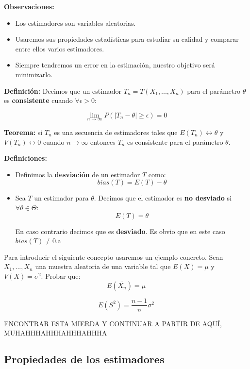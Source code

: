 \documentclass{article}
\begin{document}
			\noindent \textbf{Observaciones: }
			
			\begin{itemize}
				\item Los estimadores son variables aleatorias.
				\item Usaremos sus propiedades estadísticas para estudiar su calidad y comparar entre ellos varios estimadores.
				\item Siempre tendremos un error en la estimación, nuestro objetivo será minimizarlo.
			\end{itemize}
			
			\noindent \textbf{Definición: } Decimos que un estimador $T_n = T(X_1, ..., X_n)$ para el parámetro $\theta$ es \textbf{consistente} cuando $\forall \epsilon > 0$:
			
			$$
				\lim_{n \rightarrow \infty} P( | T_n - \theta | \geq \epsilon ) = 0 
			$$
			
			\noindent \textbf{Teorema: } si $T_n$ es una secuencia de estimadores tales que $E ( T_n ) \longleftrightarrow \theta$ y $V( T_n ) \longleftrightarrow 0$ cuando $n \rightarrow \infty$ entonces $T_n$ es consistente para el parámetro $\theta$.
			
			\noindent \textbf{Definiciones: }
			\begin{itemize}
				\item Definimos la \textbf{desviación} de un estimador $T$ como:
					$$
						bias(T) = E(T) - \theta
					$$
					
				\item Sea $T$ un estimador para $\theta$. Decimos que el estimador es \textbf{no desviado} si $\forall \theta \in \Theta$:
					$$
						E(  T ) = \theta 
					$$
					
						En caso contrario decimos que es \textbf{desviado}. Es obvio que en este caso $bias( T ) \neq 0$.a
			\end{itemize}

		\color{blue}
			 \noindent Para introducir el siguiente concepto usaremos un ejemplo concreto. Sean $X_1, ..., X_n$ una muestra aleatoria de una variable tal que $E( X ) = \mu$ y $V( X ) = \sigma^2$. Probar que: 
			 $$
			 	E( \overline{X_n}) = \mu
			 $$
			 
			 $$
			 	E ( S^{2} ) = \frac{n - 1}{n} \sigma^2
			 $$		
			
			ENCONTRAR ESTA MIERDA Y CONTINUAR A PARTIR DE AQUÍ, MUHAHHHAHHHAHHHAHHHA
			 \color{black}
		\subsection{Propiedades de los estimadores}
\end{document}
